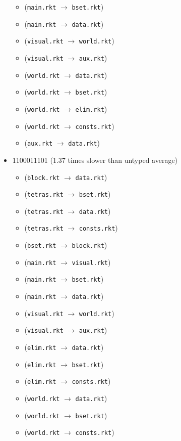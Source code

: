 \documentclass{article}
\newcommand{\mono}[1]{\texttt{#1}}
\begin{document}
\begin{itemize}
\begin{itemize}
  \item (\mono{main.rkt} $\rightarrow$ \mono{bset.rkt})
  \item (\mono{main.rkt} $\rightarrow$ \mono{data.rkt})
  \item (\mono{visual.rkt} $\rightarrow$ \mono{world.rkt})
  \item (\mono{visual.rkt} $\rightarrow$ \mono{aux.rkt})
  \item (\mono{world.rkt} $\rightarrow$ \mono{data.rkt})
  \item (\mono{world.rkt} $\rightarrow$ \mono{bset.rkt})
  \item (\mono{world.rkt} $\rightarrow$ \mono{elim.rkt})
  \item (\mono{world.rkt} $\rightarrow$ \mono{consts.rkt})
  \item (\mono{aux.rkt} $\rightarrow$ \mono{data.rkt})
  \end{itemize}
\item 1100011101 (1.37 times slower than untyped average)
  \begin{itemize}
  \item (\mono{block.rkt} $\rightarrow$ \mono{data.rkt})
  \item (\mono{tetras.rkt} $\rightarrow$ \mono{bset.rkt})
  \item (\mono{tetras.rkt} $\rightarrow$ \mono{data.rkt})
  \item (\mono{tetras.rkt} $\rightarrow$ \mono{consts.rkt})
  \item (\mono{bset.rkt} $\rightarrow$ \mono{block.rkt})
  \item (\mono{main.rkt} $\rightarrow$ \mono{visual.rkt})
  \item (\mono{main.rkt} $\rightarrow$ \mono{bset.rkt})
  \item (\mono{main.rkt} $\rightarrow$ \mono{data.rkt})
  \item (\mono{visual.rkt} $\rightarrow$ \mono{world.rkt})
  \item (\mono{visual.rkt} $\rightarrow$ \mono{aux.rkt})
  \item (\mono{elim.rkt} $\rightarrow$ \mono{data.rkt})
  \item (\mono{elim.rkt} $\rightarrow$ \mono{bset.rkt})
  \item (\mono{elim.rkt} $\rightarrow$ \mono{consts.rkt})
  \item (\mono{world.rkt} $\rightarrow$ \mono{data.rkt})
  \item (\mono{world.rkt} $\rightarrow$ \mono{bset.rkt})
  \item (\mono{world.rkt} $\rightarrow$ \mono{consts.rkt})

\end{itemize}
\end{itemize}
\end{document}
